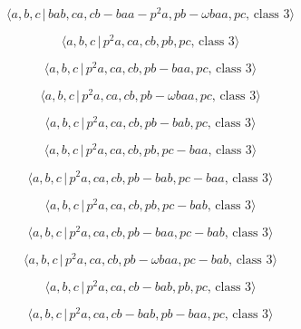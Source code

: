\documentclass[10pt]{article}
\begin{document}
\begin{equation}
\langle a,b,c\,|\,bab,ca,cb-baa-p^{2}a,pb-\omega baa,pc,\,\text{class }%
3\rangle  \tag{7.1045}
\end{equation}

\begin{equation}
\langle a,b,c\,|\,p^2a,ca,cb,pb,pc,\,\text{class }3\rangle  \tag{7.1046}
\end{equation}

\begin{equation}
\langle a,b,c\,|\,p^2a,ca,cb,pb-baa,pc,\,\text{class }3\rangle  \tag{7.1047}
\end{equation}

\begin{equation}
\langle a,b,c\,|\,p^{2}a,ca,cb,pb-\omega baa,pc,\,\text{class }3\rangle 
\tag{7.1048}
\end{equation}

\begin{equation}
\langle a,b,c\,|\,p^2a,ca,cb,pb-bab,pc,\,\text{class }3\rangle  \tag{7.1049}
\end{equation}

\begin{equation}
\langle a,b,c\,|\,p^2a,ca,cb,pb,pc-baa,\,\text{class }3\rangle  \tag{7.1050}
\end{equation}

\begin{equation}
\langle a,b,c\,|\,p^2a,ca,cb,pb-bab,pc-baa,\,\text{class }3\rangle 
\tag{7.1051}
\end{equation}

\begin{equation}
\langle a,b,c\,|\,p^2a,ca,cb,pb,pc-bab,\,\text{class }3\rangle  \tag{7.1052}
\end{equation}

\begin{equation}
\langle a,b,c\,|\,p^2a,ca,cb,pb-baa,pc-bab,\,\text{class }3\rangle 
\tag{7.1053}
\end{equation}

\begin{equation}
\langle a,b,c\,|\,p^{2}a,ca,cb,pb-\omega baa,pc-bab,\,\text{class }3\rangle 
\tag{7.1054}
\end{equation}

\begin{equation}
\langle a,b,c\,|\,p^2a,ca,cb-bab,pb,pc,\,\text{class }3\rangle  \tag{7.1055}
\end{equation}

\begin{equation}
\langle a,b,c\,|\,p^2a,ca,cb-bab,pb-baa,pc,\,\text{class }3\rangle 
\tag{7.1056}
\end{equation}
\end{document}

